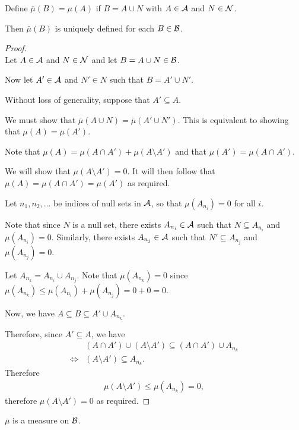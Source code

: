\begin{claim*}
  Define $\bar{\mu}(B) = \mu(A)$ if $B = A \cup N$ with $A \in \mathcal A$ and $N \in \mathcal N$.

  Then $\bar{\mu}(B)$ is uniquely defined for each $B \in \mathcal B$.
\end{claim*}

\begin{proof}~\\
  Let $A \in \mathcal A$ and $N \in \mathcal N$ and let $B = A \cup N \in \mathcal B$.

  Now let $A' \in \mathcal A$ and $N' \in N$ such that $B = A' \cup N'$.

  Without loss of generality, suppose that $A' \subseteq A$.

  We must show that $\bar{\mu}(A \cup N) = \bar{\mu}(A' \cup N')$. This is equivalent to showing
  that $\mu(A) = \mu(A')$.

  Note that $\mu(A) = \mu(A \cap A') + \mu(A \setminus A')$ and that $\mu(A') = \mu(A \cap A')$.

  We will show that $\mu(A \setminus A') = 0$. It will then follow that $\mu(A) = \mu(A \cap A') = \mu(A')$ as
  required.

  Let $n_1, n_2, \dots$ be indices of null sets in $\mathcal A$, so that $\mu(A_{n_i}) = 0$ for all $i$.

  Note that since $N$ is a null set, there exists $A_{n_i} \in \mathcal A$ such that $N \subseteq A_{n_i}$
  and $\mu(A_{n_i}) = 0$. Similarly, there exists $A_{n_j} \in \mathcal A$ such that $N' \subseteq A_{n_j}$
  and $\mu(A_{n_j}) = 0$.

  Let $A_{n_k} = A_{n_i} \cup A_{n_j}$. Note that $\mu(A_{n_k}) = 0$
  since $\mu(A_{n_k}) \leq \mu(A_{n_i}) + \mu(A_{n_j}) = 0 + 0 = 0$.

  Now, we have $A \subseteq B \subseteq A' \cup A_{n_k}$.

  Therefore, since $A' \subseteq A$, we have
  \begin{align*}
        &(A \cap A') \cup (A \setminus A') \subseteq (A \cap A') \cup A_{n_k} \\
    \iff &(A \setminus A') \subseteq A_{n_k}.
  \end{align*}
  Therefore
  \begin{align*}
    \mu(A \setminus A') \leq \mu(A_{n_k}) = 0,
  \end{align*}
  therefore $\mu(A \setminus A') = 0$ as required.
\end{proof}

\begin{claim*}
  $\bar{\mu}$ is a measure on $\mathcal B$.
\end{claim*}

